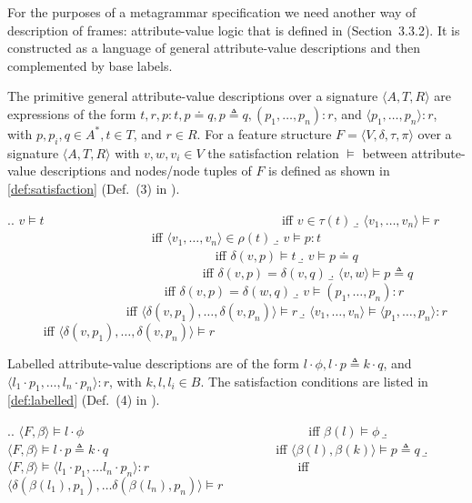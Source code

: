 For the purposes of a metagrammar specification we need another way of description of frames: attribute-value logic that is defined in \citealt{KallmeyerOsswald:13} (Section~3.3.2). It is constructed as a language of general attribute-value descriptions and then complemented by base labels.

The primitive general attribute-value descriptions over a signature $\langle A, T, R \rangle$ are expressions of the form $t, r, p : t, p \doteq q, p \triangleq q, (p_1, \ldots , p_n) : r$, and $\langle p_1, \ldots , p_n \rangle : r$,
with $p, p_i, q \in A^*, t \in T$, and $r \in R$. For a feature structure $F = \langle V, \delta, \tau, \pi \rangle$ over a signature $\langle A, T, R \rangle$ with $v,w, v_i \in V$ the satisfaction relation $\models$ between attribute-value descriptions and nodes/node tuples of $F$ is defined as shown in \ref{def:satisfaction} (Def.~(3) in \citealt{KallmeyerOsswald:13}).

\ex.\label{def:satisfaction}\a. $v \models t$ ~~~~~~~~~~~~~~~~~~~~~~~~~~~~~~~~~~~~ iff $v \in \tau (t)$
\b. $\langle v_1, \ldots , v_n \rangle \models r$ ~~~~~~~~~~~~~~~~~~~~~~ iff $\langle v_1, \ldots , v_n \rangle \in \rho (t)$
\b. $v \models p : t$ ~~~~~~~~~~~~~~~~~~~~~~~~~~~~~~~~ iff $\delta (v, p) \models t$
\b. $v \models p \doteq q$ ~~~~~~~~~~~~~~~~~~~~~~~~~~~~~~ iff $\delta (v, p) = \delta (v, q)$
\b. $\langle v, w \rangle \models p \triangleq q$ ~~~~~~~~~~~~~~~~~~~~~~~~ iff $\delta (v, p) = \delta (w, q)$
\b. $v \models (p_1, \ldots , p_n ) : r$ ~~~~~~~~~~~~~~~~~~ iff $\langle \delta (v, p_1), \ldots , \delta (v, p_n) \rangle \models r$
\b. $\langle v_1, \ldots , v_n \rangle \models \langle p_1, \ldots , p_n \rangle : r$ ~~~~~ iff $\langle \delta (v, p_1), \ldots , \delta (v, p_n) \rangle \models r$

Labelled attribute-value descriptions are of the form $l \cdot \phi, l \cdot p \triangleq k \cdot q$, and $\langle l_1 \cdot p_1, \ldots , l_n \cdot p_n \rangle : r$, with $k, l, l_i \in B$. The satisfaction conditions are listed in \ref{def:labelled} (Def.~(4) in \citealt{KallmeyerOsswald:13}).

\ex.\label{def:labelled}\a. $\langle F, \beta \rangle \models l \cdot \phi$ ~~~~~~~~~~~~~~~~~~~~~~~~~~~~~~~~~~ iff $\beta (l) \models \phi $
\b.$\langle F, \beta \rangle \models l \cdot p \triangleq k \cdot q $ ~~~~~~~~~~~~~~~~~~~~~~~~~ iff $\langle \beta (l), \beta (k) \rangle \models p \triangleq q$
\b.$\langle F, \beta \rangle \models \langle l_1 \cdot p_1, \ldots l_n \cdot p_n \rangle : r$ ~~~~~~~~~~~~~~~~~~~~~~ iff $\langle \delta (\beta (l_1), p_1), \ldots \delta (\beta (l_n), p_n) \rangle \models r $

